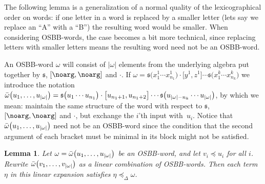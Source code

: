\documentclass[pdftex]{sigma}
\numberwithin{equation}{section}
\newtheorem{Lemma}[Theorem]{Lemma}
\begin{document}
The following lemma is a generalization of a normal quality of the lexicographical order on words: if one letter in a word is replaced by a smaller letter (lets say we replace an ``A'' with a ``B'') the resulting word would be smaller. When considering OSBB-words, the case becomes a bit more technical, since replacing letters with smaller letters means the resulting word need not be an OSBB-word.

An OSBB-word $\omega$ will consist of $|\omega|$ elements from the underlying algebra put together by $\mathfrak{s}$, $[\noarg , \noarg]$ and $\cdot$. If $\omega = \mathfrak{s}\bigl(x_1^1 \cdots x_{n_1}^1\bigr) \cdot\bigl[y^1, z^1\bigr] \cdots \mathfrak{s}\bigl(x^k_1 \cdots x^k_{n_k}\bigr)$ we introduce the notation $\Bar{\omega}\bigl(u_1 , \dots , u_{|\omega|}\bigr) = \mathfrak{s}\bigl(u_1 \cdots u_{n_1}\bigr) \cdot \bigl[u_{n_1 +1}, u_{n_1 +2}\bigr] \cdots \mathfrak{s}\bigl(u_{|\omega|-n_k} \cdots u_{|\omega|}\bigr)$, by which we mean: maintain the same structure of the word with respect to $\mathfrak{s}$, $[\noarg , \noarg]$ and $\cdot$, but exchange the $i$'th input with~$u_i$. Notice that $\Bar{\omega}\bigl(u_1 , \dots , u_{|\omega|}\bigr)$ need not be an OSBB-word since the condition that the second argument of each bracket must be minimal in its block might not be satisfied.


\begin{Lemma}\label{lemma:smaller_OSBB}
 Let $\omega = \Bar{\omega}\bigl(u_1 , \dots , u_{|\omega|}\bigr)$ be an OSBB-word, and let $v_i \preceq u_i$ for all $i$. Rewrite $\Bar{\omega}\bigl(v_1 , \dots , v_{|\omega|}\bigr)$ as a linear combination of OSBB-words. Then each term $\eta$ in this linear expansion satisfies $\eta \preceq_{\Delta} \omega$.
\end{Lemma}
\end{document}
